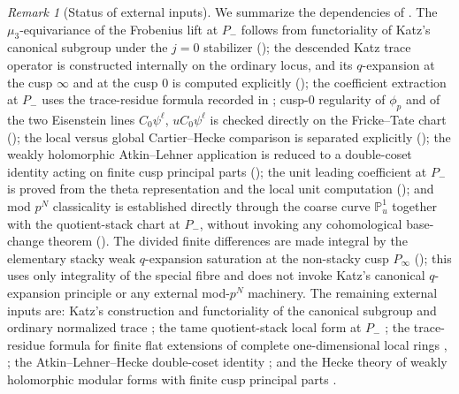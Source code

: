 \documentclass[11pt]{amsart}
\theoremstyle{definition}
\theoremstyle{remark}
\newtheorem{remark}[theorem]{Remark}
\begin{document}
\begin{remark}[Status of external inputs]\label{rem:external-inputs}
We summarize the dependencies of . The $\mu_3$-equivariance of the Frobenius lift at $P_-$ follows from functoriality of Katz's canonical subgroup under the $j=0$ stabilizer (); the descended Katz trace operator is constructed internally on the ordinary locus, and its $q$-expansion at the cusp $\infty$ and at the cusp $0$ is computed explicitly (); the coefficient extraction at $P_-$ uses the trace-residue formula recorded in ; cusp-$0$ regularity of $\phi_p$ and of the two Eisenstein lines $C_0\psi^\ell$, $uC_0\psi^\ell$ is checked directly on the Fricke--Tate chart (); the local versus global Cartier--Hecke comparison is separated explicitly (); the weakly holomorphic Atkin--Lehner application is reduced to a double-coset identity acting on finite cusp principal parts (); the unit leading coefficient at $P_-$ is proved from the theta representation and the local unit computation (); and mod $p^N$ classicality is established directly through the coarse curve $\mathbb P^1_u$ together with the quotient-stack chart at $P_-$, without invoking any cohomological base-change theorem (). The divided finite differences are made integral by the elementary stacky weak $q$-expansion saturation at the non-stacky cusp $P_\infty$ (); this uses only integrality of the special fibre and does not invoke Katz's canonical $q$-expansion principle or any external mod-$p^N$ machinery. The remaining external inputs are: Katz's construction and functoriality of the canonical subgroup and ordinary normalized trace \cite[\S\S 3.10--3.11]{Katz-padic}; the tame quotient-stack local form at $P_-$ \cite[Theorem~3.2]{AOV}; the trace-residue formula for finite flat extensions of complete one-dimensional local rings \cite[\S 3]{Tate-residues}, \cite[Ch.~III]{Hartshorne-RD}; the Atkin--Lehner--Hecke double-coset identity \cite{AtkinLehner70}; and the Hecke theory of weakly holomorphic modular forms with finite cusp principal parts \cite{Guerzhoy08}.
\end{remark}
\end{document}
